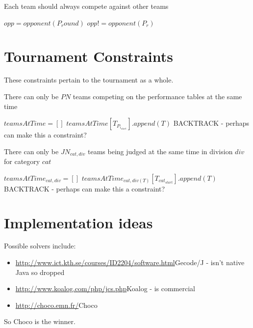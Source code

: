 \documentclass[letterpaper,11pt]{report}
\begin{document}
\begin{algorithm}
\caption{Each team should always compete against other teams}
\begin{algorithmic}
  \STATE $opp = opponent(P_round)$
    \STATE $opp != opponent(P_r)$
  \ENDFOR
\ENDFOR
\end{algorithmic}
\end{algorithm}


\section{Tournament Constraints}
These constraints pertain to the tournament as a whole.

\begin{algorithm}
\caption{There can only be $PN$ teams competing on the performance tables
at the same time}
\begin{algorithmic}

\STATE $teamsAtTime = []$
    \STATE $teamsAtTime[T_{P_{i_{start}}}].append(T)$
  \ENDFOR
      \STATE BACKTRACK - perhaps can make this a constraint?
    \ENDIF
  \ENDFOR
\ENDFOR

\end{algorithmic}
\end{algorithm}

\begin{algorithm}
\caption{There can only be $JN_{cat,div}$ teams being judged at the same
time in division $div$ for category $cat$}
\begin{algorithmic}
    \STATE $teamsAtTime_{cat,div} = []$
  \ENDFOR
    \STATE $teamsAtTime_{cat,div(T)}[T_{cat_{start}}].append(T)$
  \ENDFOR
        \STATE BACKTRACK - perhaps can make this a constraint?
      \ENDIF
    \ENDFOR
  \ENDFOR
\ENDFOR
\end{algorithmic}
\end{algorithm}

\section{Implementation ideas}
Possible solvers include:
\begin{itemize}
\item \url{http://www.ict.kth.se/courses/ID2204/software.html}{Gecode/J} - isn't native Java so dropped
\item \url{http://www.koalog.com/php/jcs.php}{Koalog} - is commercial
\item \url{http://choco.emn.fr/}{Choco}
\end{itemize}

So Choco is the winner.
\end{document}
